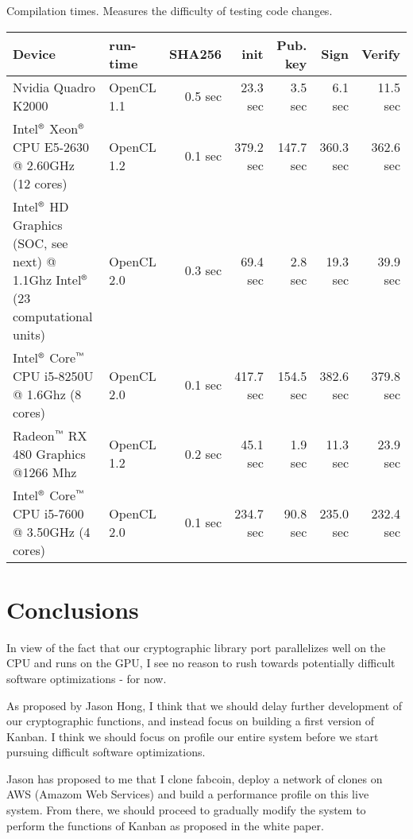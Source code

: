 \documentclass{article}
\begin{document}
Compilation times. Measures the difficulty of testing code changes.

\noindent\begin{tabular}{|p{5cm}|l|r||r|r|r|r|}\hline
	Device & run-time & SHA256 & init& Pub. key & Sign & Verify\\\hline
	Nvidia Quadro K2000 & OpenCL 1.1 &0.5 sec& 23.3 sec &3.5 sec &6.1 sec &11.5 sec\\\hline 
	Intel${}^{\text{\sffamily\textregistered}}$ Xeon${}^{\text{\sffamily\textregistered}}$ CPU E5-2630 @ 2.60GHz (12 cores)&  OpenCL 1.2&0.1 sec&379.2 sec&147.7 sec&360.3 sec&362.6 sec\\\hline \hline
	Intel${}^{\text{\sffamily\textregistered}}$ HD Graphics (SOC, see next) @ 1.1Ghz Intel${}^{\text{\sffamily\textregistered}}$ (23 computational units)& OpenCL 2.0& 0.3 sec &69.4 sec &2.8 sec&19.3 sec   & 39.9 sec \\\hline
	Intel${}^{\text{\sffamily\textregistered}}$ Core${}^{\text{\sffamily\texttrademark}}$ CPU 
	i5-8250U @ 1.6Ghz (8 cores)& OpenCL 2.0&0.1 sec&417.7 sec &154.5 sec &382.6 sec &379.8 sec \\\hline\hline 
	Radeon${}^{\text{\sffamily\texttrademark}}$ RX 480 Graphics @1266 Mhz &OpenCL 1.2&0.2 sec  &45.1 sec &1.9 sec&11.3 sec&23.9 sec \\\hline 
	Intel${}^{\text{\sffamily\textregistered}}$ Core${}^{\text{\sffamily\texttrademark}}$ CPU i5-7600 @ 3.50GHz (4 cores)&OpenCL 2.0&0.1 sec&234.7 sec&90.8 sec&235.0 sec&232.4 sec \\\hline
\end{tabular}




\section{Conclusions}
In view of the fact that our cryptographic library port parallelizes well on the CPU and runs on the GPU, I see no reason to rush towards potentially difficult software optimizations - for now. 

As proposed by Jason Hong, I think that we should delay further development of our cryptographic functions, and instead focus on building a first version of Kanban. I think we should focus on profile our entire system before we start pursuing difficult software optimizations. 

Jason has proposed to me that I clone fabcoin, deploy a network of clones on AWS (Amazom Web Services) and build a performance profile on this live system. From there, we should proceed to gradually modify the system to perform the functions of Kanban as proposed in the white paper.
\end{document}
